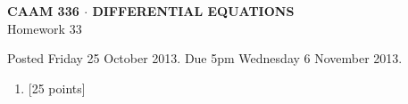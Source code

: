 \documentclass[10pt]{article}
\begin{document}
\vspace*{-5em}
\begin{center}
\large \textsf{\textbf{CAAM 336 $\cdot$ DIFFERENTIAL EQUATIONS}\\[0.5em]
Homework 33 }
\end{center}

Posted Friday 25 October 2013.  Due 5pm Wednesday 6 November 2013.

\begin{enumerate}\addtocounter{enumi}{32}
\item {[25 points]}  
\end{enumerate}
\end{document}
